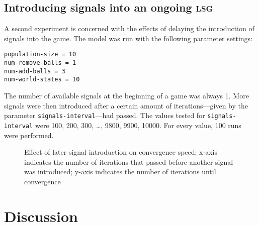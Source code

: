\documentclass[DIV=calc,BCOR=0mm,pagesize]{scrartcl}
\newcommand{\code}[1]{\texttt{#1}}
\newcommand{\lsg}{\textsc{lsg}}
\begin{document}
\subsection{Introducing signals into an ongoing \lsg}
\label{ssec:resint}
A second experiment is concerned with the effects of delaying the introduction of signals into the game. The model was run with the following parameter settings:
\begin{verbatim}
population-size = 10
num-remove-balls = 1
num-add-balls = 3
num-world-states = 10
\end{verbatim}
The number of available signals at the beginning of a game was always 1.
More signals were then introduced after a certain amount of iterations---given by the parameter \code{signals-interval}---had passed.
The values tested for \code{signals-interval} were 100, 200, 300, \ldots, 9800, 9900, 10000.
For every value, 100 runs were performed.

\begin{figure}
	\centering
	\caption{Effect of later signal introduction on convergence speed; x-axis indicates the number of iterations that passed before another signal was introduced; y-axis indicates the number of iterations until convergence}
	\label{fig:sig}
\end{figure}

\section{Discussion}
\label{sec:dis}

\citep{wilensky_netlogo_1999}
\newpage\twocolumn\recalctypearea
\end{document}
